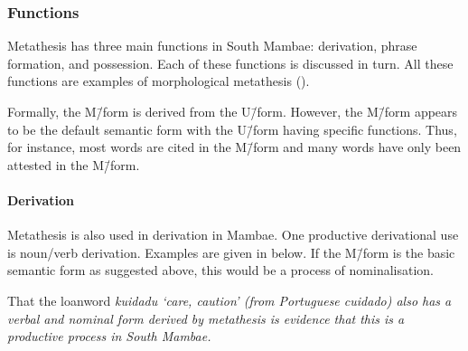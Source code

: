 \subsubsection{Functions}\label{sec:MamFun}
Metathesis has three main functions in South Mambae:
derivation, phrase formation, and possession.
Each of these functions is discussed in turn.
All these functions are examples of morphological metathesis ().

Formally, the M\=/form is derived from the U\=/form.
However, the M\=/form appears to be the default semantic
form with the U\=/form having specific functions.
Thus, for instance, most words are cited in the M\=/form
and many words have only been attested in the M\=/form.

\paragraph{Derivation}
Metathesis is also used in derivation in Mambae.
One productive derivational use is noun/verb derivation.
Examples are given in  below.
If the M\=/form is the basic semantic form
as suggested above, this would be a process of nominalisation.

\newpage
\begin{exe}
	\label{ex:MamVerDer}
\end{exe}

That the loanword \it{kuidadu} `care, caution'
(from Portuguese \it{cuidado}) also has a
verbal and nominal form derived by metathesis
is evidence that this is
a productive process in South Mambae.

